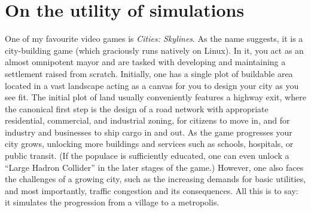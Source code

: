 %
%
%

\section*{On the utility of simulations}
One of my favourite video games is \emph{Cities: Skylines}. As the name
suggests, it is a city-building game (which graciously runs natively on Linux).
In it, you act as an almost omnipotent mayor and are tasked with developing and
maintaining a settlement raised from scratch. Initially, one has a single plot
of buildable area located in a vast landscape acting as a canvas for you to
design your city as you see fit. The initial plot of land usually conveniently
features a highway exit, where the canonical first step is the design of a road
network with appropriate residential, commercial, and industrial zoning, for
citizens to move in, and for industry and businesses to ship cargo in and out.
As the game progresses your city grows, unlocking more buildings and services
such as schools, hospitals, or public transit. (If the populace is sufficiently
educated, one can even unlock a \enquote{Large Hadron Collider} in the later
stages of the game.) However, one also faces the challenges of a growing city,
such as the increasing demands for basic utilities, and most importantly,
traffic congestion and its consequences.  All this is to say: it simulates the
progression from a village to a metropolis. 

